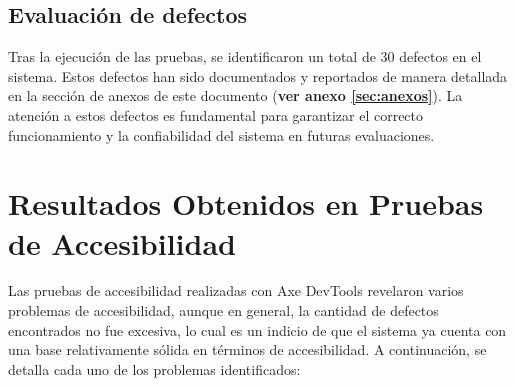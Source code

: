 \documentclass[stu, 12pt, letterpaper, donotrepeattitle, floatsintext, natbib]{apa7}
\begin{document}
\subsection{Evaluación de defectos}

Tras la ejecución de las pruebas, se identificaron un total de 30 defectos en el sistema. Estos defectos han sido documentados y reportados de manera detallada en la sección de anexos de este documento (\textbf{ver anexo \ref{sec:anexos}}). La atención a estos defectos es fundamental para garantizar el correcto funcionamiento y la confiabilidad del sistema en futuras evaluaciones. 


\newpage
\section{Resultados Obtenidos en Pruebas de Accesibilidad}

\noindent Las pruebas de accesibilidad realizadas con Axe DevTools revelaron varios problemas de accesibilidad, aunque en general, la cantidad de defectos encontrados no fue excesiva, lo cual es un indicio de que el sistema ya cuenta con una base relativamente sólida en términos de accesibilidad. A continuación, se detalla cada uno de los problemas identificados:
\end{document}
